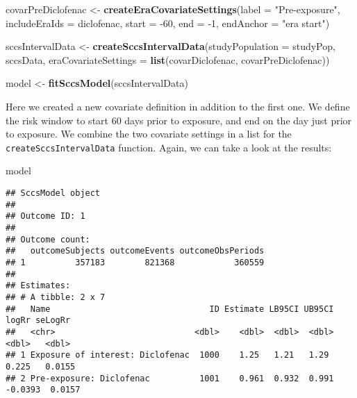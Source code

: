 \documentclass[
]{article}
\newenvironment{Shaded}{\begin{snugshade}}{\end{snugshade}}
\newcommand{\DataTypeTok}[1]{\textcolor[rgb]{0.13,0.29,0.53}{#1}}
\newcommand{\DecValTok}[1]{\textcolor[rgb]{0.00,0.00,0.81}{#1}}
\newcommand{\KeywordTok}[1]{\textcolor[rgb]{0.13,0.29,0.53}{\textbf{#1}}}
\newcommand{\NormalTok}[1]{#1}
\newcommand{\StringTok}[1]{\textcolor[rgb]{0.31,0.60,0.02}{#1}}
\begin{document}
\begin{Shaded}
\begin{Highlighting}[]
\NormalTok{covarPreDiclofenac <-}\StringTok{ }\KeywordTok{createEraCovariateSettings}\NormalTok{(}\DataTypeTok{label =} \StringTok{"Pre-exposure"}\NormalTok{,}
                                                 \DataTypeTok{includeEraIds =}\NormalTok{ diclofenac,}
                                                 \DataTypeTok{start =} \DecValTok{-60}\NormalTok{,}
                                                 \DataTypeTok{end =} \DecValTok{-1}\NormalTok{,}
                                                 \DataTypeTok{endAnchor =} \StringTok{"era start"}\NormalTok{)}

\NormalTok{sccsIntervalData <-}\StringTok{ }\KeywordTok{createSccsIntervalData}\NormalTok{(}\DataTypeTok{studyPopulation =}\NormalTok{ studyPop,}
\NormalTok{                                           sccsData,}
                                           \DataTypeTok{eraCovariateSettings =} \KeywordTok{list}\NormalTok{(covarDiclofenac, }
\NormalTok{                                                                       covarPreDiclofenac))}

\NormalTok{model <-}\StringTok{ }\KeywordTok{fitSccsModel}\NormalTok{(sccsIntervalData)}
\end{Highlighting}
\end{Shaded}

Here we created a new covariate definition in addition to the first one.
We define the risk window to start 60 days prior to exposure, and end on
the day just prior to exposure. We combine the two covariate settings in
a list for the \texttt{createSccsIntervalData} function. Again, we can
take a look at the results:

\begin{Shaded}
\begin{Highlighting}[]
\NormalTok{model}
\end{Highlighting}
\end{Shaded}

\begin{verbatim}
## SccsModel object
## 
## Outcome ID: 1
## 
## Outcome count:
##   outcomeSubjects outcomeEvents outcomeObsPeriods
## 1          357183        821368            360559
## 
## Estimates:
## # A tibble: 2 x 7
##   Name                                ID Estimate LB95CI UB95CI   logRr seLogRr
##   <chr>                            <dbl>    <dbl>  <dbl>  <dbl>   <dbl>   <dbl>
## 1 Exposure of interest: Diclofenac  1000    1.25   1.21   1.29   0.225   0.0155
## 2 Pre-exposure: Diclofenac          1001    0.961  0.932  0.991 -0.0393  0.0157
\end{verbatim}
\end{document}
